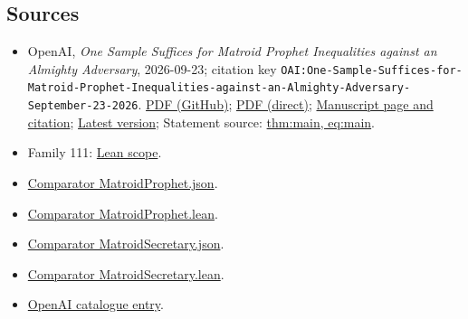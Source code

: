 \documentclass[11pt]{article}
\begin{document}
\subsection{Sources}
\begin{itemize}
\item OpenAI, \emph{One Sample Suffices for Matroid Prophet Inequalities against an Almighty Adversary}, 2026-09-23; citation key \texttt{OAI:One-Sample-Suffices-for-Matroid-Prophet-Inequalities-against-an-Almighty-Adversary-September-23-2026}. \href{https://github.com/openai/math/blob/adc7f1241b42e322a6451854ab7e4b4c146bf78a/preprints/One-Sample-Suffices-for-Matroid-Prophet-Inequalities-against-an-Almighty-Adversary-September-23-2026/final.pdf}{PDF (GitHub)}; \href{https://github.com/openai/math/raw/adc7f1241b42e322a6451854ab7e4b4c146bf78a/preprints/One-Sample-Suffices-for-Matroid-Prophet-Inequalities-against-an-Almighty-Adversary-September-23-2026/final.pdf}{PDF (direct)}; \href{https://github.com/openai/math/blob/adc7f1241b42e322a6451854ab7e4b4c146bf78a/preprints/One-Sample-Suffices-for-Matroid-Prophet-Inequalities-against-an-Almighty-Adversary-September-23-2026/README.md}{Manuscript page and citation}; \href{https://github.com/openai/math/blob/main/preprints/One-Sample-Suffices-for-Matroid-Prophet-Inequalities-against-an-Almighty-Adversary-September-23-2026/final.pdf}{Latest version}; Statement source: \href{https://github.com/openai/math/blob/adc7f1241b42e322a6451854ab7e4b4c146bf78a/preprints/One-Sample-Suffices-for-Matroid-Prophet-Inequalities-against-an-Almighty-Adversary-September-23-2026/build/sections/introduction.tex\#L24}{thm:main, eq:main}.
\item Family 111: \href{https://github.com/openai/math/blob/adc7f1241b42e322a6451854ab7e4b4c146bf78a/lean/docs/111.md}{Lean scope}.
\item \href{https://github.com/openai/math/blob/adc7f1241b42e322a6451854ab7e4b4c146bf78a/lean/ComparatorChallenges/MatroidProphet.json}{Comparator MatroidProphet.json}.
\item \href{https://github.com/openai/math/blob/adc7f1241b42e322a6451854ab7e4b4c146bf78a/lean/ComparatorChallenges/MatroidProphet.lean}{Comparator MatroidProphet.lean}.
\item \href{https://github.com/openai/math/blob/adc7f1241b42e322a6451854ab7e4b4c146bf78a/lean/ComparatorChallenges/MatroidSecretary.json}{Comparator MatroidSecretary.json}.
\item \href{https://github.com/openai/math/blob/adc7f1241b42e322a6451854ab7e4b4c146bf78a/lean/ComparatorChallenges/MatroidSecretary.lean}{Comparator MatroidSecretary.lean}.
\item \href{https://github.com/openai/math/blob/adc7f1241b42e322a6451854ab7e4b4c146bf78a/CONTENTS.md}{OpenAI catalogue entry}.
\end{itemize}
\end{document}
